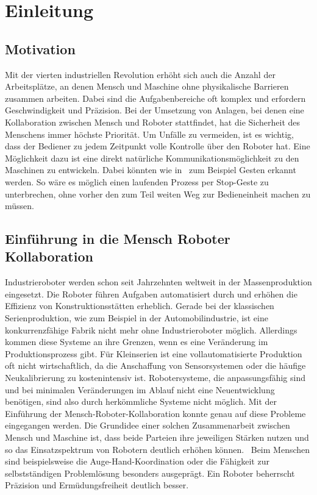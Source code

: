 \chapter{Einleitung}

\section{Motivation}
Mit der vierten industriellen Revolution erhöht sich auch die Anzahl der Arbeitsplätze, an denen Mensch und Maschine ohne physikalische Barrieren zusammen arbeiten. Dabei sind die Aufgabenbereiche oft komplex und erfordern Geschwindigkeit und Präzision. Bei der Umsetzung von Anlagen, bei denen eine Kollaboration zwischen Mensch und Roboter stattfindet, hat die Sicherheit des Menschens immer höchste Priorität. Um Unfälle zu vermeiden, ist es wichtig, dass der Bediener zu jedem Zeitpunkt volle Kontrolle über den Roboter hat. Eine Möglichkeit dazu ist eine direkt natürliche Kommunikationsmöglichkeit zu den Maschinen zu entwickeln. Dabei könnten wie in~\cite{flexibleSystem} zum Beispiel Gesten erkannt werden. So wäre es möglich einen laufenden Prozess per Stop-Geste zu unterbrechen, ohne vorher den zum Teil weiten Weg zur Bedieneinheit machen zu müssen.   

\section{Einführung in die Mensch Roboter Kollaboration}
Industrieroboter werden schon seit Jahrzehnten weltweit in der Massenproduktion eingesetzt. Die Roboter führen Aufgaben automatisiert durch und erhöhen die Effizienz von Konstruktionsstätten erheblich. Gerade bei der klassischen Serienproduktion, wie zum Beispiel in der Automobilindustrie, ist eine konkurrenzfähige Fabrik nicht mehr ohne Industrieroboter möglich. Allerdings kommen diese Systeme an ihre Grenzen, wenn es eine Veränderung im Produktionsprozess gibt. Für Kleinserien ist eine vollautomatisierte Produktion oft nicht wirtschaftlich, da die Anschaffung von Sensorsystemen oder die häufige Neukalibrierung zu kostenintensiv ist. Robotersysteme, die anpassungsfähig sind und bei minimalen Veränderungen im Ablauf nicht eine Neuentwicklung benötigen, sind also durch herkömmliche Systeme nicht möglich. Mit der Einführung der Mensch-Roboter-Kollaboration konnte genau auf diese Probleme eingegangen werden. Die Grundidee einer solchen Zusammenarbeit zwischen Mensch und Maschine ist, dass beide Parteien ihre jeweiligen Stärken nutzen und so das Einsatzspektrum von Robotern deutlich erhöhen können.~\cite{ObererTreitz.2019} Beim Menschen sind beispielsweise die Auge-Hand-Koordination oder die Fähigkeit zur selbstständigen Problemlösung besonders ausgeprägt. Ein Roboter beherrscht Präzision und Ermüdungsfreiheit deutlich besser.~\cite{fraunhoferMRK}

